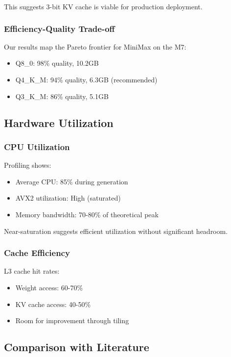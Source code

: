 This suggests 3-bit KV cache is viable for production deployment.

\subsubsection{Efficiency-Quality Trade-off}

Our results map the Pareto frontier for MiniMax on the M7:

\begin{itemize}
    \item Q8\_0: 98\% quality, 10.2GB
    \item Q4\_K\_M: 94\% quality, 6.3GB (recommended)
    \item Q3\_K\_M: 86\% quality, 5.1GB
\end{itemize}

\subsection{Hardware Utilization}

\subsubsection{CPU Utilization}

Profiling shows:

\begin{itemize}
    \item Average CPU: 85\% during generation
    \item AVX2 utilization: High (saturated)
    \item Memory bandwidth: 70-80\% of theoretical peak
\end{itemize}

Near-saturation suggests efficient utilization without significant headroom.

\subsubsection{Cache Efficiency}

L3 cache hit rates:

\begin{itemize}
    \item Weight access: 60-70\%
    \item KV cache access: 40-50\%
    \item Room for improvement through tiling
\end{itemize}

\subsection{Comparison with Literature}

